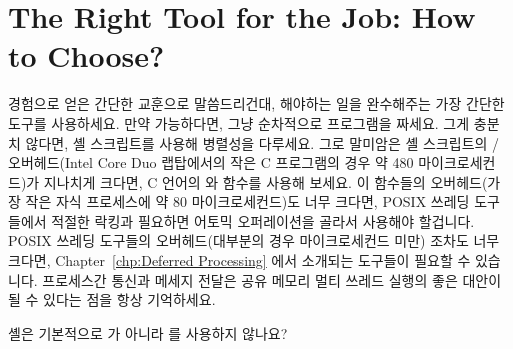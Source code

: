 {{{{\section{The Right Tool for the Job: How to Choose?}
\label{sec:toolsoftrade:The Right Tool for the Job: How to Choose?}

경험으로 얻은 간단한 교훈으로 말씀드리건대, 해야하는 일을 완수해주는 가장
간단한 도구를 사용하세요.
만약 가능하다면, 그냥 순차적으로 프로그램을 짜세요.
그게 충분치 않다면, 셸 스크립트를 사용해 병렬성을 다루세요.
그로 말미암은 셸 스크립트의 / 오버헤드(Intel Core Duo
랩탑에서의 작은 C 프로그램의 경우 약 480 마이크로세컨드)가 지나치게 크다면, C
언어의  와  함수를 사용해 보세요.
이 함수들의 오버헤드(가장 작은 자식 프로세스에 약 80 마이크로세컨드)도 너무
크다면, POSIX 쓰레딩 도구들에서 적절한 락킹과 필요하면 어토믹 오퍼레이션을
골라서 사용해야 할겁니다.
POSIX 쓰레딩 도구들의 오버헤드(대부분의 경우 마이크로세컨드 미만) 조차도 너무
크다면, Chapter~\ref{chp:Deferred Processing} 에서 소개되는 도구들이 필요할 수
있습니다.
프로세스간 통신과 메세지 전달은 공유 메모리 멀티 쓰레드 실행의 좋은 대안이 될
수 있다는 점을 항상 기억하세요.

\QuickQuiz{}
	셸은 기본적으로  가 아니라  를 사용하지 않나요?
	\iffalse

}}}}
